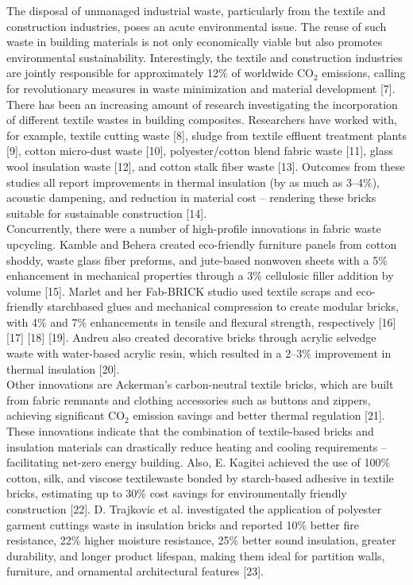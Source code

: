 \noindent The disposal of unmanaged industrial waste, particularly from the textile and construction industries, poses an acute environmental issue. The reuse of such waste in building materials is not only economically viable but also promotes environmental sustainability. Interestingly, the textile and construction industries are jointly responsible for approximately 12\% of worldwide CO$_{2}$ emissions, calling for revolutionary measures in waste minimization and material development [7]. \\

\noindent There has been an increasing amount of research investigating the incorporation of different textile wastes in building composites. Researchers have worked with, for example, textile cutting waste [8], sludge from textile effluent treatment plants [9], cotton micro-dust waste [10], polyester/cotton blend fabric waste [11], glass wool insulation waste [12], and cotton stalk fiber waste [13]. Outcomes from these studies all report improvements in thermal insulation (by as much as 3--4\%), acoustic dampening, and reduction in material cost -- rendering these bricks suitable for sustainable construction [14]. \\

\noindent Concurrently, there were a number of high-profile innovations in fabric waste upcycling. Kamble and Behera created eco-friendly furniture panels from cotton shoddy, waste glass fiber preforms, and jute-based nonwoven sheets with a 5\% enhancement in mechanical properties through a 3\% cellulosic filler addition by volume [15]. Marlet and her Fab-BRICK studio used textile scraps and eco-friendly starchbased glues and mechanical compression to create modular bricks, with 4\% and 7\% enhancements in tensile and flexural strength, respectively [16] [17] [18] [19]. Andreu also created decorative bricks through acrylic selvedge waste with water-based acrylic resin, which resulted in a 2--3\% improvement in thermal insulation [20]. \\

\noindent Other innovations are Ackerman’s carbon-neutral textile bricks, which are built from fabric remnants and clothing accessories such as buttons and zippers, achieving significant CO${_2}$ emission savings and better thermal regulation [21]. These innovations indicate that the combination of textile-based bricks and insulation materials can drastically reduce heating and cooling requirements -- facilitating net-zero energy building. Also, E. Kagitci achieved the use of 100\% cotton, silk, and viscose textilewaste bonded by starch-based adhesive in textile bricks, estimating up to 30\% cost savings for environmentally friendly construction [22]. D. Trajkovic et al. investigated the application of polyester garment cuttings waste in insulation bricks and reported 10\% better fire resistance, 22\% higher moisture resistance, 25\% better sound insulation, greater durability, and longer product lifespan, making them ideal for partition walls, furniture, and ornamental architectural features [23]. \\

